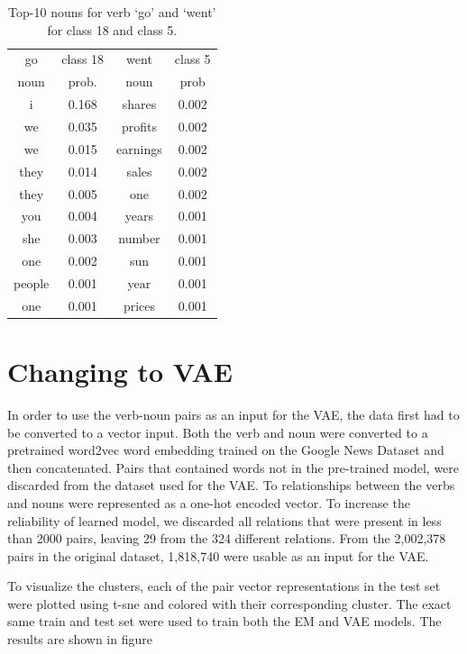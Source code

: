 \documentclass[11pt]{scrartcl}
\begin{document}
  \begin{table}
    \centering
\begin{tabular}{c c c c}
\toprule
go & class 18 & went & class 5 \\
noun & prob. & noun & prob \\
\midrule
i & 0.168        & shares & 0.002 \\
we & 0.035       & profits & 0.002 \\
we & 0.015       & earnings & 0.002 \\
they & 0.014     & sales & 0.002 \\
they & 0.005     & one & 0.002 \\
you & 0.004      & years & 0.001 \\
she & 0.003      & number & 0.001 \\
one & 0.002      & sun & 0.001 \\
people & 0.001   & year & 0.001 \\
one & 0.001      & prices & 0.001 \\
\bottomrule
\end{tabular}
\caption{Top-10 nouns for verb `go' and `went' for class 18 and class 5.}
\label{table:topnoun}
\end{table}

\section{Changing to VAE}
In order to use the verb-noun pairs as an input for the VAE, the data first had to be converted to a vector input. Both the verb and noun were converted to a pretrained word2vec\cite{mikolov2013efficient} word embedding trained on the Google News Dataset and then concatenated. Pairs that contained words not in the pre-trained model, were discarded from the dataset used for the VAE. To relationships between the verbs and nouns were represented as a one-hot encoded vector. To increase the reliability of learned model, we discarded all relations that were present in less than 2000 pairs, leaving 29 from the 324 different relations. From the 2,002,378 pairs in the original dataset, 1,818,740 were usable as an input for the VAE.  



To visualize the clusters, each of the pair vector representations in the test set were plotted using t-sne and colored with their corresponding cluster. The exact same train and test set were used to train both the EM and VAE models. The results are shown in figure 
\end{document}

